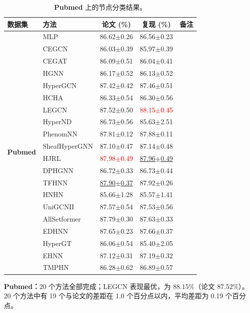 \documentclass[11pt,a4paper]{article}
\begin{document}
\begin{table}[H]
	\centering\small
	\begin{tabular}{llccc}
		\toprule
		数据集 & 方法 & 论文 (\%) & 复现 (\%) & 备注 \\
		\midrule
		\multirow{20}{*}{\textbf{Pubmed}} & MLP               & 86.62$\pm$0.26   & 86.56$\pm$0.23   &  \\
		 & CEGCN             & 86.03$\pm$0.39   & 85.97$\pm$0.39   &  \\
		 & CEGAT             & 86.09$\pm$0.51   & 86.04$\pm$0.41   &  \\
		 & HGNN              & 86.17$\pm$0.52   & 86.13$\pm$0.52   &  \\
		 & HyperGCN          & 87.42$\pm$0.42   & 87.46$\pm$0.51   &  \\
		 & HCHA              & 86.33$\pm$0.54   & 86.30$\pm$0.56   &  \\
		 & LEGCN             & 87.52$\pm$0.50   & \textcolor{red}{88.15$\pm$0.45}   &  \\
		 & HyperND           & 86.73$\pm$0.56   & 85.63$\pm$2.51   &  \\
		 & PhenomNN          & 87.81$\pm$0.12   & 87.88$\pm$0.11   &  \\
		 & SheafHyperGNN     & 87.10$\pm$0.47   & 87.14$\pm$0.48   &  \\
		 & HJRL              & \textcolor{red}{87.98$\pm$0.49}   & \underline{87.96$\pm$0.49}   &  \\
		 & DPHGNN            & 86.72$\pm$0.33   & 86.73$\pm$0.44   &  \\
		 & TFHNN             & \underline{87.90$\pm$0.37}   & 87.92$\pm$0.26   &  \\
		 & HNHN              & 85.66$\pm$1.28   & 85.57$\pm$1.41   &  \\
		 & UniGCNII          & 87.57$\pm$0.54   & 87.53$\pm$0.56   &  \\
		 & AllSetformer      & 87.79$\pm$0.30   & 87.63$\pm$0.33   &  \\
		 & EDHNN             & 87.65$\pm$0.23   & 87.66$\pm$0.37   &  \\
		 & HyperGT           & 86.06$\pm$0.54   & 85.40$\pm$2.05   &  \\
		 & EHNN              & 87.12$\pm$0.31   & 87.19$\pm$0.32   &  \\
		 & TMPHN             & 86.28$\pm$0.62   & 86.89$\pm$0.57   &  \\
		\bottomrule
	\end{tabular}
	\caption{\textbf{Pubmed} 上的节点分类结果。}
\end{table}
\par\smallskip
\noindent\textbf{Pubmed：}20 个方法全部完成；LEGCN 表现最优，为 $88.15\%$（论文 $87.52\%$）。20 个方法中有 19 个与论文的差距在 1.0 个百分点以内，平均差距为 0.19 个百分点。
\end{document}
